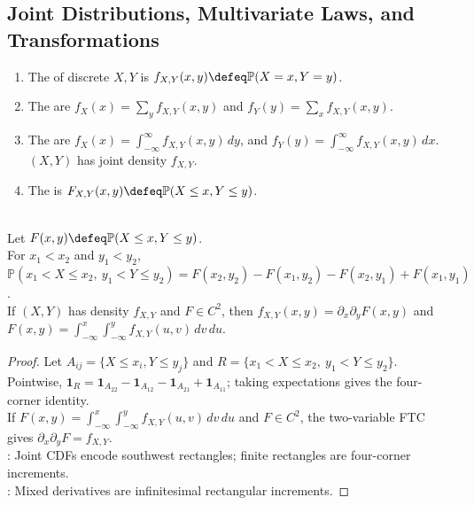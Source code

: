 \subsection{Joint Distributions, Multivariate Laws, and Transformations}

\begin{definition} \label{def:joint-distributions-and-marginals} 
\begin{enumerate}[label=(\roman*)]
\setlength{\itemsep}{0pt}
\item The  of discrete $X,Y$ is $f_{X,Y}(x,y)\defeq\mathbb{P}(X=x,Y=y)$.
\item The  are $f_X(x)=\sum\limits_y f_{X,Y}(x,y)$ and $f_Y(y)=\sum\limits_x f_{X,Y}(x,y)$.
\item The  are $f_X(x)=\int_{-\infty}^{\infty}f_{X,Y}(x,y)\,dy$, and $f_Y(y)=\int_{-\infty}^{\infty}f_{X,Y}(x,y)\,dx$.\\
$(X,Y)$ has joint density $f_{X,Y}$.
\item The  is $F_{X,Y}(x,y)\defeq\mathbb{P}(X\leq x,Y\leq y)$.
\end{enumerate}
\end{definition}

\begin{proposition} \label{prop:joint-cdf-rectangular-increments-and-density} \\
Let $F(x,y)\defeq\mathbb{P}(X\leq x,Y\leq y)$.\\
For $x_1<x_2$ and $y_1<y_2$, $\mathbb{P}(x_1<X\leq x_2,\ y_1<Y\leq y_2)=F(x_2,y_2)-F(x_1,y_2)-F(x_2,y_1)+F(x_1,y_1)$.\\
If $(X,Y)$ has density $f_{X,Y}$ and $F\in C^2$, then $f_{X,Y}(x,y)=\partial_x\partial_yF(x,y)$ and $F(x,y)=\int_{-\infty}^{x}\int_{-\infty}^{y}f_{X,Y}(u,v)\,dv\,du$.
\begin{proof} Let $A_{ij}=\{X\leq x_i,Y\leq y_j\}$ and $R=\{x_1<X\leq x_2,\ y_1<Y\leq y_2\}$.\\
Pointwise, $\mathbf{1}_R=\mathbf{1}_{A_{22}}-\mathbf{1}_{A_{12}}-\mathbf{1}_{A_{21}}+\mathbf{1}_{A_{11}}$; taking expectations gives the four-corner identity.\\
If $F(x,y)=\int_{-\infty}^{x}\int_{-\infty}^{y}f_{X,Y}(u,v)\,dv\,du$ and $F\in C^2$, the two-variable FTC gives $\partial_x\partial_yF=f_{X,Y}$.\\
: Joint CDFs encode southwest rectangles; finite rectangles are four-corner increments.\\
: Mixed derivatives are infinitesimal rectangular increments.
\end{proof}
\end{proposition}

